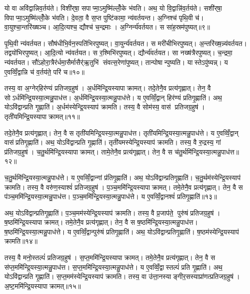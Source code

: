 यो वा अवि॑द्वान्निव॒र्तय॑ते। विशी॑र्‌षा॒ सपाप्मा॒ऽमुष्मि॑ल्लोँ॒के भ॑वति। अथ॒ यो वि॒द्वान्नि॑व॒र्तय॑ते। सशी॑र्‌षा॒ विपाप्मा॒ऽमुष्मि॑ल्लोँ॒के भ॑वति। दे॒वता॒ वै स॒प्त पुष्टि॑कामा॒ न्य॑वर्तयन्त। अ॒ग्निश्च॑ पृथि॒वी च॑। वा॒युश्चा॒न्तरि॑ख्षञ्च। आ॒दि॒त्यश्च॒ द्यौश्च॑ च॒न्द्रमाः। अ॒ग्निर्न्य॑वर्तयत। स सा॑ह॒स्रम॑पुष्यत्॥९॥

पृ॒थि॒वी न्य॑वर्तयत। सौष॑धीभि॒र्वन॒स्पति॑भिरपुष्यत्। वा॒युर्न्य॑वर्तयत। स मरी॑चीभिरपुष्यत्। अ॒न्तरि॑ख्ष॒न्न्य॑वर्तयत। तद्वयो॑भिरपुष्यत्। आ॒दि॒त्यो न्य॑वर्तयत। स र॒श्मिभि॑रपुष्यत्। द्यौर्न्य॑वर्तयत। सा नख्ष॑त्रैरपुष्यत्। च॒न्द्रमा॒ न्य॑वर्तयत। सौ॑ऽहोरा॒त्रैर॑र्धमा॒सैर्मासैर्॑ऋ॒तुभि॑ संवत्स॒रेणा॑पुष्यत्। तान्पोषान्पुष्यति। यास्तेऽपु॑ष्यन्न्। य ए॒वव्विँ॒द्वान्नि च॑ व॒र्तय॑ते॒ परि॑ च॥१०॥\anuvakamend[अ॒पु॒ष्य॒न्नख्ष॑त्रैरपुष्य॒त्पञ्च॑ च]

तस्य॒ वा अ॒ग्नेर्‌हिर॑ण्यं प्रतिजग्र॒हुष॑। अ॒र्धमि॑न्द्रि॒यस्यापाक्रामत्। तदे॒तेनै॒व प्रत्य॑गृह्णात्। तेन॒ वै सोऽर्धमि॑न्द्रि॒यस्या॒त्मन्नु॒पाध॑त्त। अ॒र्धमि॑न्द्रि॒यस्या॒त्मन्नु॒पाध॑त्ते। य ए॒वव्विँ॒द्वान् हिर॑ण्यं प्रतिगृ॒ह्णाति॑। अथ॒ योऽवि॑द्वान्प्रति गृ॒ह्णाति॑। अ॒र्धम॑स्येन्द्रि॒यस्याप॑ क्रामति। तस्य॒ वै सोम॑स्य॒ वास॑ प्रतिजग्र॒हुष॑। तृती॑यमिन्द्रि॒यस्यापाक्रामत्॥११॥

तदे॒तेनै॒व प्रत्य॑गृह्णात्। तेन॒ वै स तृती॑यमिन्द्रि॒यस्या॒त्मन्नु॒पाध॑त्त। तृती॑यमिन्द्रि॒यस्या॒त्मन्नु॒पाध॑त्ते। य ए॒वव्विँ॒द्वान् वास॑प्रतिगृ॒ह्णाति॑। अथ॒ योऽवि॑द्वान्प्रति गृ॒ह्णाति॑। तृती॑यमस्येन्द्रि॒यस्याप॑ क्रामति। तस्य॒ वै रु॒द्रस्य॒ गां प्र॑तिजग्र॒हुष॑। च॒तु॒र्थमि॑न्द्रि॒यस्यापाक्रामत्। तामे॒तेनै॒व प्रत्य॑गृह्णात्। तेन॒ वै स च॑तु॒र्थमि॑न्द्रि॒यस्या॒त्मन्नु॒पाध॑त्त॥१२॥

च॒तु॒र्थमि॑न्द्रि॒यस्या॒त्मन्नु॒पाध॑त्ते। य ए॒वव्विँ॒द्वान्गां प्र॑तिगृ॒ह्णाति॑। अथ॒ योऽवि॑द्वान्प्रतिगृ॒ह्णाति॑। च॒तु॒र्थम॑स्येन्द्रि॒यस्याप॑ क्रामति। तस्य॒ वै वरु॑ण॒स्याश्वं॑ प्रतिजग्र॒हुष॑। प॒ञ्च॒ममि॑न्द्रि॒यस्यापाक्रामत्। तमे॒तेनै॒व प्रत्य॑गृह्णात्। तेन॒ वै स प॑ञ्च॒ममि॑न्द्रि॒यस्या॒त्मन्नु॒पाध॑त्त। प॒ञ्च॒ममि॑न्द्रि॒यस्या॒त्मन्नु॒पाध॑त्ते। य ए॒वव्विँ॒द्वानश्वं॑ प्रतिगृ॒ह्णाति॑॥१३॥

अथ॒ योऽवि॑द्वान्प्रतिगृ॒ह्णाति॑। प॒ञ्च॒मम॑स्येन्द्रि॒यस्याप॑ क्रामति। तस्य॒ वै प्र॒जाप॑ते॒ पुरु॑षं प्रतिजग्र॒हुष॑। ष॒ष्ठमि॑न्द्रि॒यस्यापाक्रामत्। तमे॒तेनै॒व प्रत्य॑गृह्णात्। तेन॒ वै स ष॒ष्ठमि॑न्द्रि॒यस्या॒त्मन्नु॒पाध॑त्त। ष॒ष्ठमि॑न्द्रि॒यस्या॒त्मन्नु॒पाध॑त्ते। य ए॒वव्विँ॒द्वान्पुरु॑षं प्रतिगृ॒ह्णाति॑। अथ॒ योऽवि॑द्वान्प्रतिगृ॒ह्णाति॑। ष॒ष्ठम॑स्येन्द्रि॒यस्याप॑ क्रामति॥१४॥

तस्य॒ वै मनो॒स्तल्पं॑ प्रतिजग्र॒हुष॑। स॒प्त॒ममि॑न्द्रि॒यस्यापाक्रामत्। तमे॒तेनै॒व प्रत्य॑गृह्णात्। तेन॒ वै स स॑प्त॒ममि॑न्द्रि॒यस्या॒त्मन्नु॒पाध॑त्त। स॒प्त॒ममि॑न्द्रि॒यस्या॒त्मन्नु॒पाध॑त्ते। य ए॒वव्विँ॒द्वास्तल्पं॑ प्रति गृ॒ह्णाति॑। अथ॒ योऽवि॑द्वान्प्रति गृ॒ह्णाति॑। स॒प्त॒मम॑स्येन्द्रि॒यस्याप॑ क्रामति। तस्य॒ वा उ॑त्ता॒नस्याङ्गीर॒सस्याप्रा॑णत्प्रतिजग्र॒हुष॑। अ॒ष्ट॒ममि॑न्द्रि॒यस्यापाक्रामत्॥१५॥

